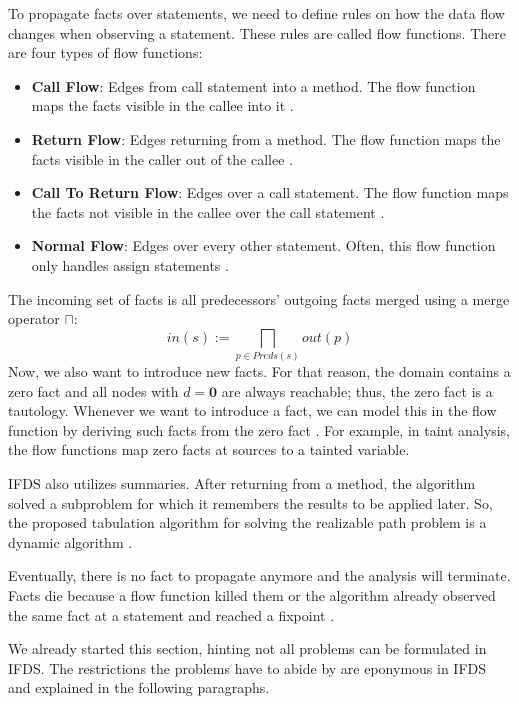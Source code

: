 \documentclass[../draft.tex]{subfiles}
\begin{document}
    To propagate facts over statements, we need to define rules on how the data flow changes when observing a statement. These rules are called flow functions. There are four types of flow functions:
    \begin{itemize}
        \item \textbf{Call Flow}: Edges from call statement into a method. The flow function maps the facts visible in the callee into it \cite{Reps1995}. 
        \item \textbf{Return Flow}: Edges returning from a method. The flow function maps the facts visible in the caller out of the callee \cite{Reps1995}.
        \item \textbf{Call To Return Flow}: Edges over a call statement. The flow function maps the facts not visible in the callee over the call statement \cite{Reps1995}.
        \item \textbf{Normal Flow}: Edges over every other statement. Often, this flow function only handles assign statements \cite{Reps1995}.
    \end{itemize}
    The incoming set of facts is all predecessors' outgoing facts merged using a merge operator $\sqcap$: 
    $$
        in(s) := \bigsqcap_{p \in Preds(s)} out(p)
    $$
    Now, we also want to introduce new facts. For that reason, the domain contains a zero fact and all nodes with $d=\textbf{0}$ are always reachable; thus, the zero fact is a tautology. Whenever we want to introduce a fact, we can model this in the flow function by deriving such facts from the zero fact  \cite{Reps1995}. For example, in taint analysis, the flow functions map zero facts at sources to a tainted variable. 

    IFDS also utilizes summaries. After returning from a method, the algorithm solved a subproblem for which it remembers the results to be applied later. So, the proposed tabulation algorithm for solving the realizable path problem is a dynamic algorithm \cite{Reps1995}. 

    Eventually, there is no fact to propagate anymore and the analysis will terminate. Facts die because a flow function killed them or the algorithm already observed the same fact at a statement and reached a fixpoint \cite{Reps1995}.

    We already started this section, hinting not all problems can be formulated in IFDS. The restrictions the problems have to abide by are eponymous in IFDS and explained in the following paragraphs.
\end{document}
